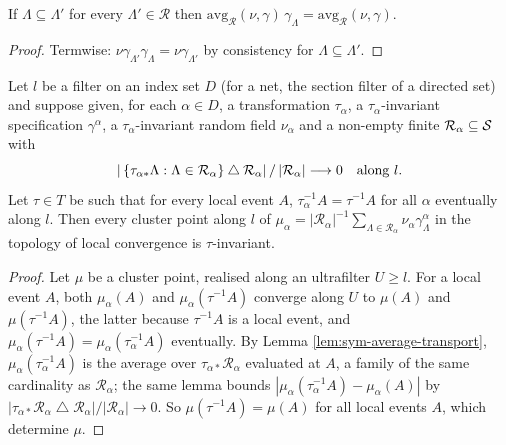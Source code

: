\begin{lemma}
    \label{lem:sym-consistency-average}
    \leanok

    If $\Lambda \subseteq \Lambda'$ for every $\Lambda' \in \mathcal{R}$ then
    $\mathrm{avg}_{\mathcal{R}}(\nu,\gamma)\, \gamma_\Lambda
      = \mathrm{avg}_{\mathcal{R}}(\nu,\gamma)$.
\end{lemma}
\begin{proof}
    \leanok

    Termwise: $\nu\gamma_{\Lambda'}\gamma_\Lambda = \nu\gamma_{\Lambda'}$ by consistency for
    $\Lambda \subseteq \Lambda'$.
\end{proof}

\begin{proposition}[Georgii (5.18)]
    \label{prop:sym-5-18}
    \leanok

    Let $l$ be a filter on an index set $D$ (for a net, the section filter of a directed set)
    and suppose given, for each $\alpha \in D$, a transformation $\tau_\alpha$, a
    $\tau_\alpha$-invariant specification $\gamma^\alpha$, a $\tau_\alpha$-invariant random
    field $\nu_\alpha$ and a non-empty finite $\mathcal{R}_\alpha \subseteq \mathcal{S}$ with
    \[
      |\left\{ \tau_{\alpha*}\Lambda : \Lambda \in \mathcal{R}_\alpha \right\} \mathbin{\triangle}
        \mathcal{R}_\alpha| \, / \, |\mathcal{R}_\alpha| \longrightarrow 0
      \quad\text{along } l .
    \]
    Let $\tau \in T$ be such that for every local event $A$, $\tau_\alpha^{-1}A = \tau^{-1}A$
    for all $\alpha$ eventually along $l$. Then every cluster point along $l$ of
    $\mu_\alpha = |\mathcal{R}_\alpha|^{-1}\sum_{\Lambda \in \mathcal{R}_\alpha}
    \nu_\alpha \gamma^\alpha_\Lambda$ in the topology of local convergence is $\tau$-invariant.
\end{proposition}
\begin{proof}
    \leanok

    Let $\mu$ be a cluster point, realised along an ultrafilter $U \ge l$. For a local event
    $A$, both $\mu_\alpha(A)$ and $\mu_\alpha(\tau^{-1}A)$ converge along $U$ to $\mu(A)$ and
    $\mu(\tau^{-1}A)$, the latter because $\tau^{-1}A$ is a local event, and
    $\mu_\alpha(\tau^{-1}A) = \mu_\alpha(\tau_\alpha^{-1}A)$ eventually. By
    Lemma \ref{lem:sym-average-transport}, $\mu_\alpha(\tau_\alpha^{-1}A)$ is the average over
    $\tau_{\alpha*}\mathcal{R}_\alpha$ evaluated at $A$, a family of the same cardinality as
    $\mathcal{R}_\alpha$; the same lemma bounds $|\mu_\alpha(\tau_\alpha^{-1}A) - \mu_\alpha(A)|$
    by $|\tau_{\alpha*}\mathcal{R}_\alpha \mathbin{\triangle} \mathcal{R}_\alpha| /
    |\mathcal{R}_\alpha| \to 0$. So $\mu(\tau^{-1}A) = \mu(A)$ for all local events $A$, which
    determine $\mu$.
\end{proof}


